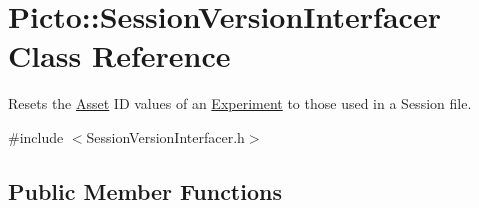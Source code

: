 \hypertarget{class_picto_1_1_session_version_interfacer}{\section{Picto\-:\-:Session\-Version\-Interfacer Class Reference}
\label{class_picto_1_1_session_version_interfacer}
}


Resets the \hyperlink{class_picto_1_1_asset}{Asset} I\-D values of an \hyperlink{class_picto_1_1_experiment}{Experiment} to those used in a Session file.  




{\ttfamily \#include $<$Session\-Version\-Interfacer.\-h$>$}

\subsection*{Public Member Functions}
